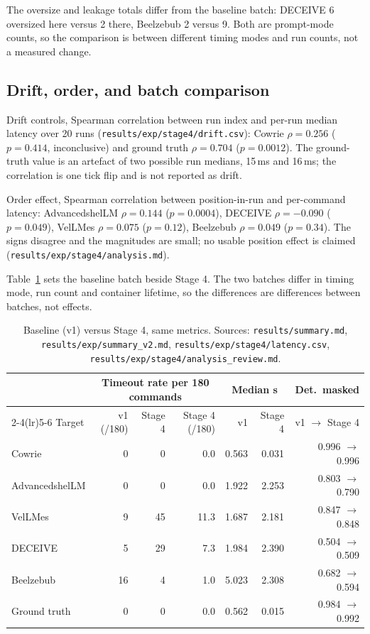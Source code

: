 \documentclass[a4paper,11pt]{article}
\begin{document}
The oversize and leakage totals differ from the baseline batch: DECEIVE 6
oversized here versus 2 there, Beelzebub 2 versus 9. Both are prompt-mode
counts, so the comparison is between different timing modes and run counts,
not a measured change.

\subsection{Drift, order, and batch comparison}

Drift controls, Spearman correlation between run index and per-run median
latency over 20 runs (\texttt{results/exp/stage4/drift.csv}): Cowrie
$\rho=0.256$ ($p=0.414$, inconclusive) and ground truth $\rho=0.704$
($p=0.0012$). The ground-truth value is an artefact of two possible run
medians, 15\,ms and 16\,ms; the correlation is one tick flip and is not
reported as drift.

Order effect, Spearman correlation between position-in-run and per-command
latency: AdvancedshelLM $\rho=0.144$ ($p=0.0004$), DECEIVE $\rho=-0.090$
($p=0.049$), VelLMes $\rho=0.075$ ($p=0.12$), Beelzebub $\rho=0.049$
($p=0.34$). The signs disagree and the magnitudes are small; no usable
position effect is claimed (\texttt{results/exp/stage4/analysis.md}).

Table~\ref{tab:s4-vs-v1} sets the baseline batch beside Stage 4. The two
batches differ in timing mode, run count and container lifetime, so the
differences are differences between batches, not effects.

\begin{table}[ht]
\centering
\caption{Baseline (v1) versus Stage 4, same metrics. Sources:
\texttt{results/summary.md}, \texttt{results/exp/summary\_v2.md},
\texttt{results/exp/stage4/latency.csv},
\texttt{results/exp/stage4/analysis\_review.md}.}
\label{tab:s4-vs-v1}
\scriptsize
\setlength{\tabcolsep}{4pt}
\begin{tabular}{@{}l r r r r r r@{}}
\toprule
 & \multicolumn{3}{c}{Timeout rate per 180 commands} & \multicolumn{2}{c}{Median s} & Det.\ masked \\
\cmidrule(lr){2-4}\cmidrule(lr){5-6}
Target & v1 (/180) & Stage 4 & Stage 4 (/180) & v1 & Stage 4 & v1 $\rightarrow$ Stage 4 \\
\midrule
Cowrie & 0 & 0 & 0.0 & 0.563 & 0.031 & 0.996 $\rightarrow$ 0.996 \\
AdvancedshelLM & 0 & 0 & 0.0 & 1.922 & 2.253 & 0.803 $\rightarrow$ 0.790 \\
VelLMes & 9 & 45 & 11.3 & 1.687 & 2.181 & 0.847 $\rightarrow$ 0.848 \\
DECEIVE & 5 & 29 & 7.3 & 1.984 & 2.390 & 0.504 $\rightarrow$ 0.509 \\
Beelzebub & 16 & 4 & 1.0 & 5.023 & 2.308 & 0.682 $\rightarrow$ 0.594 \\
Ground truth & 0 & 0 & 0.0 & 0.562 & 0.015 & 0.984 $\rightarrow$ 0.992 \\
\bottomrule
\end{tabular}
\end{table}
\end{document}

